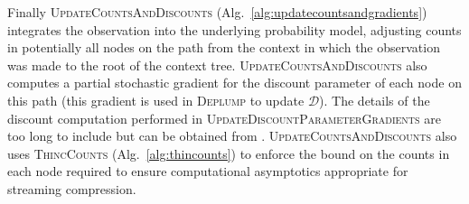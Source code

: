Finally \textsc{UpdateCountsAndDiscounts} (Alg.~\ref{alg:updatecountsandgradients}) integrates the observation into the underlying probability model, adjusting counts in potentially all nodes on the path from the context in which the observation was made to the root of the context tree.   \textsc{UpdateCountsAndDiscounts} also computes a partial stochastic gradient for the discount parameter of each node on this path (this gradient is used in \textsc{Deplump} to update $\mathcal{D}$).  The details of the discount computation performed in \textsc{UpdateDiscountParameterGradients} are too long to include but can be obtained from \cite{Gasthaus2010}.  \textsc{UpdateCountsAndDiscounts} also uses \textsc{ThincCounts} (Alg.~\ref{alg:thincounts}) to enforce the bound on the counts in each node required to ensure computational asymptotics appropriate for streaming compression. 




